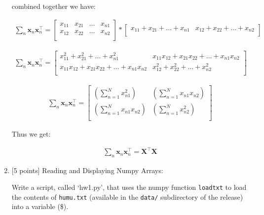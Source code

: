 \documentclass[10pt]{article}
\begin{document}
\begin{enumerate}
combined together we have:

\begin{eqnarray*}
\sum_{n} \mathbf{x}_n \mathbf{x}_n ^\top =
    \begin{bmatrix}
    x_{11} & x_{21} & \hdots & x_{n1} \\[0.3em]
    x_{12} & x_{22} & \hdots & x_{n2} \\[0.3em]
    \end{bmatrix}
    *
    \begin{bmatrix}
    x_{11} + x_{21} + \hdots + x_{n1} & x_{12} + x_{22} + \hdots + x_{n2} \\[0.3em]
    \end{bmatrix}
\end{eqnarray*}


\begin{eqnarray*}
\sum_{n} \mathbf{x}_n \mathbf{x}_n ^\top =
    \begin{bmatrix}
    x_{11}^2 + x_{21}^2 + \hdots + x_{n1}^2 & x_{11} x_{12} + x_{21} x_{22} + \hdots + x_{n1}  x_{n2}  \\[0.3em]
    x_{11} x_{12} + x_{21} x_{22} + \hdots + x_{n1}  x_{n2} & x_{12}^2 + x_{22}^2 + \hdots + x_{n2}^2 \\[0.3em]
    \end{bmatrix}
\end{eqnarray*}


\begin{eqnarray*}
\sum_{n} \mathbf{x}_n \mathbf{x}_n ^\top =
    \begin{bmatrix}
    \left( \sum_{n=1}^N x_{n1}^2 \right)  & \left( \sum_{n=1}^N x_{n1}x_{n2} \right) \\[0.3em]
    \left( \sum_{n=1}^N x_{n1}x_{n2} \right)  & \left( \sum_{n=1}^N x_{n2}^2 \right) \\[0.3em]
    \end{bmatrix}
\end{eqnarray*}

Thus we get:

\begin{eqnarray*}
\sum_{n} \mathbf{x}_n \mathbf{x}_n ^\top = \mathbf{X}^\top\mathbf{X}
\end{eqnarray*}

\item \label{prob:6} [5 points]
Reading and Displaying Numpy Arrays:

Write a script, called `hw1.py', that uses the numpy function {\tt loadtxt} to load the contents of {\tt humu.txt} (available in the {\tt data/} subdirectory of the release) into a variable (\$).


\end{enumerate}
\end{document}
